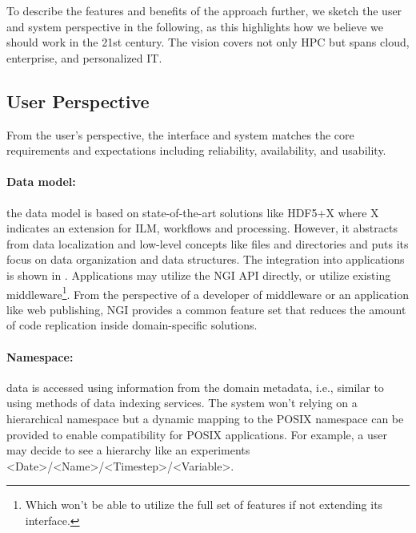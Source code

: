 \documentclass[a4paper, twocolumn]{article}
\begin{document}
To describe the features and benefits of the approach further, we sketch the user and system perspective in the following, as this highlights how we believe we should work in the 21st century.
The vision covers not only HPC but spans cloud, enterprise, and personalized IT.

\subsection{User Perspective}

\newcommand{\bnf}[1]{\textless #1\textgreater}

From the user's perspective, the interface and system matches the core requirements and expectations including reliability, availability, and usability.

\paragraph{Data model:} the data model is based on state-of-the-art solutions like HDF5+X where X indicates an extension for ILM, workflows and processing.
However, it abstracts from data localization and low-level concepts like files and directories and puts its focus on data organization and data structures.
The integration into applications is shown in .
Applications may utilize the NGI API directly, or utilize existing middleware\footnote{Which won't be able to utilize the full set of features if not extending its interface.}.
From the perspective of a developer of middleware or an application like web publishing, NGI provides a common feature set that reduces the amount of code replication inside domain-specific solutions.


\paragraph{Namespace:} data is accessed using information from the domain metadata, i.e., similar to using methods of data indexing services.
The system won't relying on a hierarchical namespace but a dynamic mapping to the POSIX namespace can be provided to enable compatibility for POSIX applications.
For example, a user may decide to see a hierarchy like an experiments \bnf{Date}/\bnf{Name}/\bnf{Timestep}/\bnf{Variable}.
\end{document}
